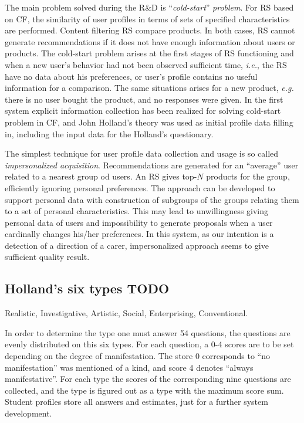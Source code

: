 \documentclass[conference,a4]{IEEEtran}
\begin{document}
The main problem solved during the R\&D is ``\emph{cold-start}'' \emph{problem}.  For RS based on CF, the similarity of user profiles in terms of sets of specified characteristics are performed. Content filtering RS compare products. In both cases, RS cannot generate recommendations if it does not have enough information about users or products.  The cold-start problem arises at the first stages of RS functioning and when a new user's behavior had not been observed sufficient time, \emph{i.e.}, the RS have no data about his preferences, or user's profile contains no useful information for a comparison.  The same situations arises for a new product, \emph{e.g.} there is no user bought the product, and no responses were given.  In the first system explicit information collection has been realized for solving cold-start problem in CF, and John Holland's theory was used as initial profile data filling in, including the input data for the Holland's questionary.

The simplest technique for user profile data collection and usage is so called \emph{impersonalized acquisition}.  Recommendations are generated for an ``average'' user related to a nearest group od users.  An RS gives top-$N$ products for the group, efficiently ignoring personal preferences.  The approach can be developed to support personal data with construction of subgroups of the groups relating them to a set of personal characteristics.  This may lead to unwillingness giving personal data of users and impossibility to generate proposals when a user cardinally changes his/her preferences.  In this system, as our intention is a detection of a direction of a carer, impersonalized approach seems to give sufficient quality result.

\subsection{Holland's six types TODO}

Realistic, Investigative, Artistic, Social, Enterprising, Conventional. %

In order to determine the type one must answer 54 questions, the questions are evenly distributed on this six types.  For each question, a 0-4 scores are to be set depending on the degree of manifestation. The store 0 corresponds to ``no manifestation'' was mentioned of a kind, and score 4 denotes ``always manifestative''.  For each type the scores of the corresponding nine questions are collected, and the type is figured out as a type with the maximum score sum.  Student profiles store all answers and estimates, just for a further system development.
\end{document}
